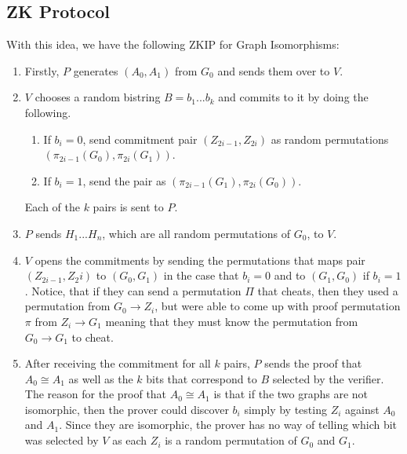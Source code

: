 \documentclass[11pt]{article}
\begin{document}
\subsection{ZK Protocol}
With this idea, we have the following ZKIP for Graph Isomorphisms:
\begin{enumerate}
    \item Firstly, $P$ generates $(A_0,A_1)$ from $G_0$ and sends them over to $V$.
    \item $V$ chooses a random bistring $B = b_1...b_k$ and commits to it by doing the following.
    \begin{enumerate}
        \item If $b_i = 0$, send commitment pair $(Z_{2i-1},Z_{2i})$ as random permutations $(\pi_{2i-1}(G_0),\pi_{2i}(G_1))$.
        \item If $b_i = 1$, send the pair as $(\pi_{2i-1}(G_1), \pi_{2i}(G_0))$.
    \end{enumerate}
    Each of the $k$ pairs is sent to $P$.
    \item $P$ sends $H_1...H_n$, which are all random permutations of $G_0$, to $V$.
    \item $V$ opens the commitments by sending the permutations that maps pair $(Z_{2i-1},Z_2i)$ to $(G_0,G_1)$ in the case that $b_i = 0$ and to $(G_1,G_0)$ if $b_i = 1$. Notice, that if they can send a permutation $\Pi$ that cheats, then they used a permutation from $G_0 \rightarrow Z_i$, but were able to come up with proof permutation $\pi$ from $Z_i \rightarrow G_1$ meaning that they must know the permutation from $G_0 \rightarrow G_1$ to cheat.
    \item After receiving the commitment for all $k$ pairs, $P$ sends the proof that $A_0 \cong A_1$ as well as the $k$ bits that correspond to $B$ selected by the verifier. The reason for the proof that $A_0 \cong A_1$ is that if the two graphs are not isomorphic, then the prover could discover $b_i$ simply by testing $Z_i$ against $A_0$ and $A_1$. Since they are isomorphic, the prover has no way of telling which bit was selected by $V$ as each $Z_i$ is a random permutation of $G_0$ and $G_1$. 
\end{enumerate}
\end{document}
